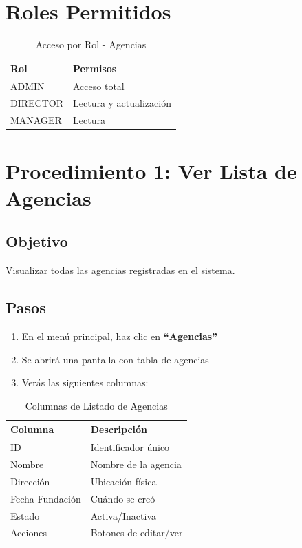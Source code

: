 \documentclass[12pt,a4paper,spanish,oneside]{report}
\begin{document}
\section{Roles Permitidos}

\begin{table}[H]
\centering
\caption{Acceso por Rol - Agencias}
\begin{tabular}{|l|l|}
\hline
\textbf{Rol} & \textbf{Permisos} \\
\hline
ADMIN & Acceso total \\
\hline
DIRECTOR & Lectura y actualización \\
\hline
MANAGER & Lectura \\
\hline
\end{tabular}
\end{table}

\section{Procedimiento 1: Ver Lista de Agencias}

\subsection{Objetivo}

Visualizar todas las agencias registradas en el sistema.

\subsection{Pasos}

\begin{enumerate}
    \item En el menú principal, haz clic en \textbf{``Agencias''}
    \item Se abrirá una pantalla con tabla de agencias
    \item Verás las siguientes columnas:
\end{enumerate}

\begin{table}[H]
\centering
\caption{Columnas de Listado de Agencias}
\begin{tabular}{|l|p{6cm}|}
\hline
\textbf{Columna} & \textbf{Descripción} \\
\hline
ID & Identificador único \\
\hline
Nombre & Nombre de la agencia \\
\hline
Dirección & Ubicación física \\
\hline
Fecha Fundación & Cuándo se creó \\
\hline
Estado & Activa/Inactiva \\
\hline
Acciones & Botones de editar/ver \\
\hline
\end{tabular}
\end{table}
\end{document}
